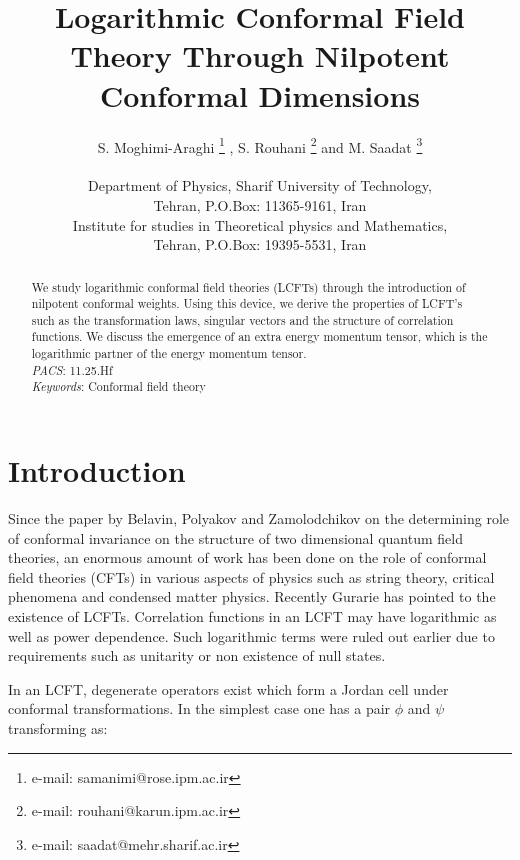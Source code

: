 \documentclass[a4paper,11pt]{article}
\begin{document}
\title{Logarithmic Conformal Field Theory Through Nilpotent Conformal Dimensions}
\author{S. Moghimi-Araghi \footnote{e-mail: samanimi@rose.ipm.ac.ir} ,
S. Rouhani \footnote{e-mail: rouhani@karun.ipm.ac.ir} and M.
Saadat \footnote{e-mail: saadat@mehr.sharif.ac.ir}\\
\\
Department of Physics, Sharif University of Technology,\\ Tehran,
P.O.Box: 11365-9161, Iran\\ Institute for studies in Theoretical
physics and Mathematics,\\ Tehran, P.O.Box: 19395-5531, Iran}
\maketitle
\begin{abstract}
We study logarithmic conformal field theories (LCFTs) through the
introduction of nilpotent conformal weights. Using this device, we
derive the properties of LCFT's such as the transformation laws,
singular vectors and the structure of correlation functions. We
discuss the emergence of an extra energy momentum tensor, which
is the logarithmic partner of the energy momentum tensor.
\vspace{5mm}\\
{\it PACS}: 11.25.Hf \\
{\it Keywords}: Conformal field theory
\end{abstract}
\section{Introduction}
Since the paper by Belavin, Polyakov and Zamolodchikov \cite{BPZ}
on the determining role of conformal invariance on the structure
of two dimensional quantum field theories, an enormous amount of
work has been done on the role of conformal field theories (CFTs)
in various aspects of physics such as string theory, critical
phenomena and condensed matter physics. Recently Gurarie
\cite{Gur} has pointed to the existence of LCFTs. Correlation
functions in an LCFT may have logarithmic as well as power
dependence. Such logarithmic terms were ruled out earlier due to
requirements such as unitarity or non existence of null states.

In an LCFT, degenerate operators exist which form a Jordan cell
under conformal transformations. In the simplest case one has a
pair $\phi$ and $\psi$ transforming as:
\end{document}
